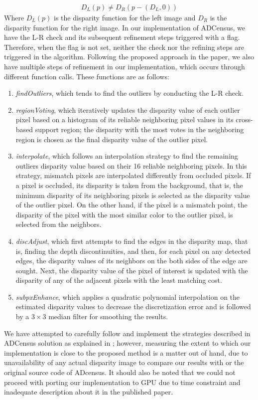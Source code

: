 \begin{align}
D_{L}(p) \neq D_{R}(p-(D_{L},0))
\end{align}
\noindent
Where $D_{L}(p)$ is the disparity function for the left image and $D_{R}$ is the disparity function for the right image. \newline 
In our implementation of ADCensus, we have the L-R check and its subsequent refinement steps triggered with a flag.
Therefore, when the flag is not set, neither the check nor the refining steps are triggered in the algorithm.
Following the proposed approach in the paper, we also have multiple steps of refinement in our implementation, which occurs through different function calls.
These functions are as follows:
\begin{enumerate}
\item \textit{findOutliers}, which tends to find the outliers by conducting the L-R check.
\item \textit{regionVoting}, which iteratively updates the disparity value of each outlier pixel 
based on a histogram of its reliable neighboring pixel values in its cross-based support region; the disparity with the most votes in the neighboring region 
is chosen as the final disparity value of the outlier pixel.
\item \textit{interpolate}, which follows an interpolation strategy to find the remaining outliers disparity value based on their 
16 reliable neighboring pixels. 
In this strategy, mismatch pixels are
interpolated differently from occluded pixels. If a pixel is occluded, its disparity is taken from the background, that is, the minimum disparity of its neighboring
pixels is selected as the disparity value of the outlier pixel. On the other hand, if the pixel is a mismatch point, the disparity of the pixel with the most
similar color to the outlier pixel, is selected from the neighbors.
\item \textit{discAdjust}, which first attempts to find the edges in the disparity map, that is, finding the depth discontinuities, and then, for each pixel on any
detected edges, the disparity values of its neighbors on the both sides of the edge are sought. Next, the disparity value of the pixel of interest is updated with the disparity of 
any of the adjacent pixels with the least matching cost.
\item \textit{subpxEnhance}, which applies a quadratic polynomial interpolation on the estimated disparity values to decrease the discretization 
error and is followed by a $3\times3$ median filter for smoothing the results.  
\end{enumerate}
We have attempted to carefully follow and implement the strategies described in ADCensus solution as explained in \cite{mei11}; however, measuring the extent to which
our implementation is close to the proposed method is a matter out of hand, due to unavailability of any actual disparity image 
to compare our results with or the original source code of ADcensus.
It should also be noted that we could not proceed with porting our implementation to GPU due to time constraint and inadequate description
about it in the published paper.

